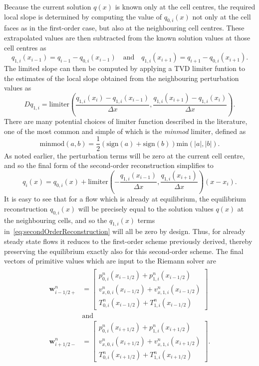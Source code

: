 Because the current solution $q(x)$ is known only at the cell centres, the required local slope is determined by computing the value of $q_{0,i}(x)$ not only at the cell faces as in the first-order case, but also at the neighbouring cell centres. These extrapolated values are then subtracted from the known solution values at those cell centres as
\begin{equation}
q_{1,i}(x_{i-1})=q_{i-1}-q_{0,i}(x_{i-1})\quad \textrm{and}\quad q_{1,i}(x_{i+1})=q_{i+1}-q_{0,i}(x_{i+1}).
\end{equation}
The limited slope can then be computed by applying a TVD limiter funtion to the estimates of the local slope obtained from the neighbouring perturbation values as
\begin{equation}
Dq_{1,i}=\textrm{limiter}\left(\frac{q_{1,i}(x_i)-q_{1,i}(x_{i-1})}{\Delta x},\frac{q_{1,i}(x_{i+1})-q_{1,i}(x_i)}{\Delta x}\right).
\end{equation}
There are many potential choices of limiter function described in the literature, one of the most common and simple of which is the \emph{minmod} limiter, defined as
\begin{equation} \label{eq:minmod}
\textrm{minmod}(a,b)=\frac{1}{2}\left(\textrm{sign}(a)+\textrm{sign}(b)\right)\textrm{min}\left(|a|,|b|\right).
\end{equation}
As noted earlier, the perturbation terms will be zero at the current cell centre, and so the final form of the second-order reconstruction simplifies to
\begin{equation} \label{eq:secondOrderReconstruction}
q_i(x)=q_{0,i}(x)+\textrm{limiter}\left(-\frac{q_{1,i}(x_{i-1})}{\Delta x},\frac{q_{1,i}(x_{i+1})}{\Delta x}\right)(x-x_i).
\end{equation}
It is easy to see that for a flow which is already at equilibrium, the equilibrium reconstruction $q_{0,i}(x)$ will be precisely equal to the solution values $q(x)$ at the neighbouring cells, and so the $q_{1,i}(x)$ terms in~\eqref{eq:secondOrderReconstruction} will all be zero by design. Thus, for already steady state flows it reduces to the first-order scheme previously derived, thereby preserving the equilibrium exactly also for this second-order scheme. The final vectors of primitive values which are input to the Riemann solver are
\begin{align} \label{eq:primitives1D2}
\begin{split}
\mathbf{w}_{i-1/2+}^n&=
\begin{bmatrix}
p_{0,i}^n(x_{i-1/2})+p_{1,i}^n(x_{i-1/2}) \\ v_{x,0,i}^n(x_{i-1/2})+v_{x,1,i}^n(x_{i-1/2}) \\ T_{0,i}^n(x_{i-1/2})+T_{1,i}^n(x_{i-1/2})
\end{bmatrix} \\
&\textrm{and} \\
\mathbf{w}_{i+1/2-}^n&=
\begin{bmatrix}
p_{0,i}^n(x_{i+1/2})+p_{1,i}^n(x_{i+1/2}) \\ v_{x,0,i}^n(x_{i+1/2})+ v_{x,1,i}^n(x_{i+1/2}) \\ T_{0,i}^n(x_{i+1/2})+T_{1,i}^n(x_{i+1/2})
\end{bmatrix}.
\end{split}
\end{align}
